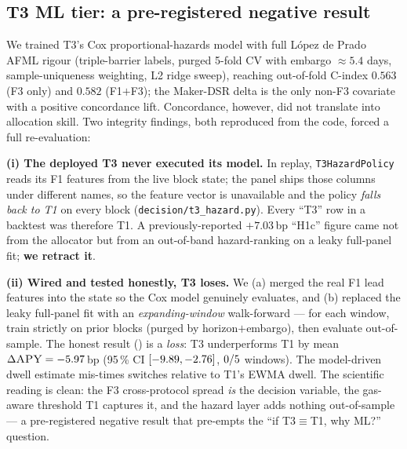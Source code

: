\subsection{T3 ML tier: a pre-registered negative result}
\label{sec:emp-t3neg}

We trained T3's Cox proportional-hazards model with full L\'opez de
Prado AFML rigour (triple-barrier labels, purged 5-fold CV with
embargo $\approx 5.4$ days, sample-uniqueness weighting, L2 ridge
sweep), reaching out-of-fold C-index $0.563$ (F3 only) and $0.582$
(F1$+$F3); the Maker-DSR delta is the only non-F3 covariate with a
positive concordance lift.  Concordance, however, did not translate
into allocation skill.  Two integrity findings, both reproduced from
the code, forced a full re-evaluation:

\textbf{(i) The deployed T3 never executed its model.}  In replay,
\texttt{T3HazardPolicy} reads its F1 features from the live block
state; the panel ships those columns under different names, so the
feature vector is unavailable and the policy \emph{falls back to T1}
on every block (\texttt{decision/t3\_hazard.py}).  Every ``T3'' row
in a backtest was therefore T1.  A previously-reported $+7.03$\,bp
``H1c'' figure came not from the allocator but from an out-of-band
hazard-ranking on a leaky full-panel fit; \textbf{we retract it}.

\textbf{(ii) Wired and tested honestly, T3 loses.}  We (a) merged the
real F1 lead features into the state so the Cox model genuinely
evaluates, and (b) replaced the leaky full-panel fit with an
\emph{expanding-window} walk-forward --- for each window, train
strictly on prior blocks (purged by horizon$+$embargo), then
evaluate out-of-sample.  The honest result ()
is a \emph{loss}: T3 underperforms T1 by mean
$\Delta\textsc{APY} = -5.97$\,bp
(95\,\% CI $[-9.89, -2.76]$,
$0/5$ windows).  The model-driven dwell
estimate mis-times switches relative to T1's EWMA dwell.  The
scientific reading is clean: the F3 cross-protocol spread \emph{is}
the decision variable, the gas-aware threshold T1 captures it, and
the hazard layer adds nothing out-of-sample --- a pre-registered
negative result that pre-empts the ``if T3$\equiv$T1, why ML?''
question.


